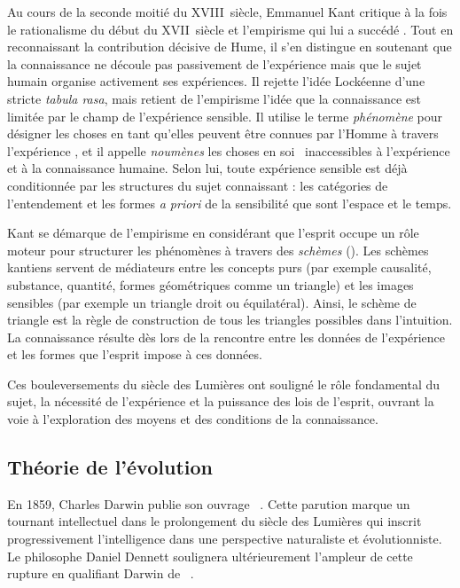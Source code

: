 Au cours de la seconde moitié du XVIII\ieme{}~siècle, Emmanuel Kant critique à la fois le rationalisme du début du XVII\ieme{}~siècle et l'empirisme qui lui a succédé \cite{kant_kritik_1781}.
Tout en reconnaissant la contribution décisive de Hume, il s'en distingue en soutenant que la connaissance ne découle pas passivement de l'expérience mais que le sujet humain organise activement ses expériences.
Il rejette l'idée Lockéenne d'une stricte \emph{tabula rasa}, mais retient de l'empirisme l'idée que la connaissance est limitée par le champ de l'expérience sensible.
Il utilise le terme \emph{phénomène} pour désigner les \og choses en tant qu'elles peuvent être connues par l'Homme à travers l'expérience \fg, et il appelle \emph{noumènes} les \og choses en soi \fg\ inaccessibles à l'expérience et à la connaissance humaine.
Selon lui, toute expérience sensible est déjà conditionnée par les structures du sujet connaissant : les catégories de l'entendement et les formes \textit{a priori} de la sensibilité que sont l'espace et le temps.

Kant se démarque de l'empirisme en considérant que l’esprit occupe un rôle moteur pour structurer les phénomènes à travers des \emph{schèmes} ().
Les schèmes kantiens servent de médiateurs entre les concepts purs (par exemple causalité, substance, quantité, formes géométriques comme un triangle) et les images sensibles (par exemple un triangle droit ou équilatéral).
Ainsi, le schème de triangle est la règle de construction de tous les triangles possibles dans l'intuition.
La connaissance résulte dès lors de la rencontre entre les données de l’expérience et les formes que l’esprit impose à ces données.

Ces bouleversements du siècle des Lumières ont souligné le rôle fondamental du sujet, la nécessité de l’expérience et la puissance des lois de l’esprit, ouvrant la voie à l'exploration des moyens et des conditions de la connaissance.

\subsection{Théorie de l'évolution}


\noindent
En 1859, Charles Darwin publie son ouvrage  \fg\ \cite{darwin_origin_1859}.
Cette parution marque un tournant intellectuel dans le prolongement du siècle des Lumières qui inscrit progressivement l’intelligence dans une perspective naturaliste et évolutionniste.
Le philosophe Daniel Dennett soulignera ultérieurement l'ampleur de cette rupture en qualifiant Darwin de \og {} \fg\   \cite[p.~10061]{dennett_darwins_2009}.

